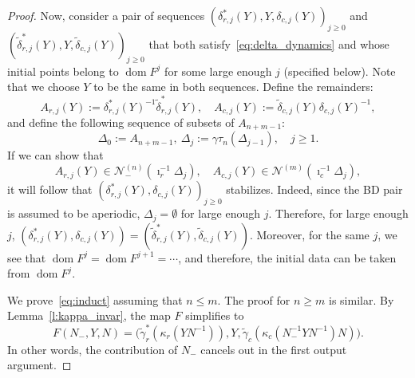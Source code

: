 \documentclass[11pt]{article}
\DeclareMathOperator{\dom}{dom}
\theoremstyle{definition}\newtheorem{definition}[theorem]{Definition}
\theoremstyle{definition}\newtheorem{remark}[theorem]{Remark}
\theoremstyle{remark}
\numberwithin{equation}{section}
\begin{document}
\begin{proof}
    Now, consider a pair of sequences $({\delta}_{r,j}^*(Y),Y,{\delta}_{c,j}(Y))_{j \geq 0}$ and $(\tilde{\delta}_{r,j}^*(Y),Y,\tilde{\delta}_{c,j}(Y))_{j \geq 0}$ that both satisfy~\eqref{eq:delta_dynamics} and whose initial points belong to $\dom F^j$ for some large enough $j$ (specified below). Note that we choose $Y$ to be the same in both sequences. Define the remainders:
    \begin{equation*}
        A_{r,j}(Y) := \delta_{r,j}^*(Y)^{-1}\tilde{\delta}_{r,j}^*(Y), \quad A_{c,j}(Y) := \tilde{\delta}_{c,j}(Y)\delta_{c,j}(Y)^{-1},
    \end{equation*}
    and define the following sequence of subsets of $A_{n+m-1}$:
    \begin{equation*}
        \Delta_0 := A_{n+m-1}, \ \Delta_j := \gamma \tau_n(\Delta_{j-1}), \quad j \geq 1.
    \end{equation*}
     If we can show that
     \begin{equation}\label{eq:induct}
         A_{r,j}(Y) \in \mathcal{N}_-^{(n)}(\imath_r^{-1}\Delta_{j}), \quad A_{c,j}(Y) \in \mathcal{N}^{(m)}(\imath_c^{-1}\Delta_{j}),
     \end{equation}
     it will follow that $(\delta_{r,j}^*(Y),\delta_{c,j}(Y))_{j \geq 0}$ stabilizes. Indeed, since the BD pair is assumed to be aperiodic, $\Delta_{j} = \emptyset$ for large enough $j$. Therefore, for large enough $j$, $(\delta_{r,j}^*(Y),\delta_{c,j}(Y)) = (\tilde{\delta}_{r,j}^*(Y),\tilde{\delta}_{c,j}(Y))$. Moreover, for the same $j$, we see that $\dom F^j = \dom F^{j+1} = \cdots$, and therefore, the initial data can be taken from $\dom F^j$.

    We prove~\eqref{eq:induct} assuming that $n \leq m$. The proof for $n \geq m$ is similar. By Lemma~\ref{l:kappa_invar}, the map $F$ simplifies to
    \begin{equation*}
        F(N_-,Y,N) = \big( \tilde{\gamma}_r^*(\kappa_r(YN^{-1})),Y, \tilde{\gamma}_c(\kappa_c(N_-^{-1}YN^{-1})N) \big).
    \end{equation*}
    In other words, the contribution of $N_-$ cancels out in the first output argument.
    

\end{proof}
\end{document}
